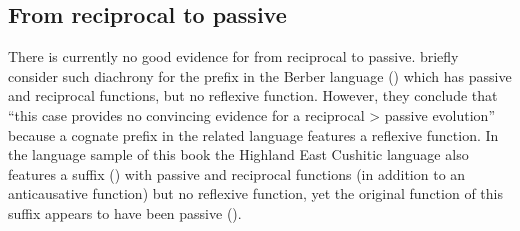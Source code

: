\subsection{From reciprocal to passive} \label{diachrony:recp2pass}
There is currently no good evidence for  from reciprocal to passive. \cite[206]{heine:miyashita:2008} briefly consider such diachrony for the prefix  in the Berber language  () which has passive and reciprocal functions, but no reflexive function. However, they conclude that “this case provides no convincing evidence for a reciprocal > passive evolution” because a cognate prefix in the related language  features a reflexive function. In the language sample of this book the Highland East Cushitic language  also features a suffix () with passive and reciprocal functions (in addition to an anticausative function) but no reflexive function, yet the original function of this suffix appears to have been passive (). 

